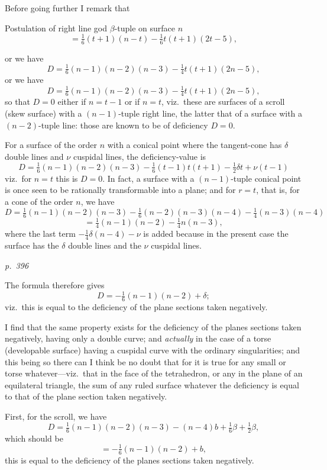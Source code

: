\documentclass[11pt,a4paper]{book}
\begin{document}
Before going further I remark that
\begin{center}
Postulation of right line god $\beta$-tuple on surface $n$
\[
= \tfrac{1}{6}(t + 1)(n - t) - \tfrac{1}{6}t(t + 1)(2t - 5),
\]
\end{center}
or we have
\[
D = \tfrac{1}{6}(n - 1)(n - 2)(n - 3) - \tfrac{1}{4}t(t + 1)(2n - 5),
\]
or we have
\[
D = \tfrac{1}{6}(n - 1)(n - 2)(n - 3) - \tfrac{1}{4}t(t + 1)(2n - 5),
\]
so that $D = 0$ either if $n = t - 1$ or if $n = t$, viz.\ these are surfaces of a scroll
(skew surface) with a $(n - 1)$-tuple right line, the latter that of a surface with a
$(n - 2)$-tuple line: those are known to be of deficiency $D = 0$.

For a surface of the order $n$ with a conical point where the tangent-cone has
$\delta$ double lines and $\nu$ cuspidal lines, the deficiency-value is
\[
D = \tfrac{1}{6}(n - 1)(n - 2)(n - 3) - \tfrac{1}{6}(t - 1)t(t + 1) - \tfrac{1}{2}\delta t + \nu(t - 1)
\]
viz.\ for $n = t$ this is $D = 0$.  In fact, a surface with a $(n - 1)$-tuple conical point is
once seen to be rationally transformable into a plane; and for $r = t$, that is, for a
cone of the order $n$, we have
\[
D = \tfrac{1}{6}(n - 1)(n - 2)(n - 3) - \tfrac{1}{6}(n - 2)(n - 3)(n - 4) - \tfrac{1}{4}(n - 3)(n - 4)
\]
\[
= \tfrac{1}{4}(n - 1)(n - 2) - \tfrac{1}{4}n(n - 3),
\]
where the last term $-\tfrac{1}{4}\delta(n - 4) - \nu$ is added because in the present case the surface
has the $\delta$ double lines and the $\nu$ cuspidal lines.

\clearpage

\bigskip
\textit{p.~396}
\smallskip

\noindent
The formula therefore gives
\[
D = -\tfrac{1}{6}(n - 1)(n - 2) + \delta;
\]
viz.\ this is equal to the deficiency of the plane sections taken negatively.

I find that the same property exists for the deficiency of the planes sections taken negatively,
having only a double curve; and \textit{actually} in the case of a torse (developable surface)
having a cuspidal curve with the ordinary singularities; and this being so there can
I think be no doubt that for it is true for any small or torse whatever---viz.\ that
in the face of the tetrahedron, or any in the plane of an equilateral triangle, the sum
of any ruled surface whatever the deficiency is equal to that of the plane section
taken negatively.

First, for the scroll, we have
\[
D = \tfrac{1}{6}(n - 1)(n - 2)(n - 3) - (n - 4)b + \tfrac{1}{6}\beta + \tfrac{1}{2}\beta,
\]
which should be
\[
= -\tfrac{1}{6}(n - 1)(n - 2) + b,
\]
this is equal to the deficiency of the planes sections taken negatively.
\end{document}
